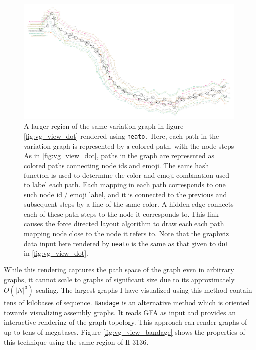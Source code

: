 \begin{figure}[htbp!] 
\centering    
\includegraphics[width=1.0\textwidth]{Chapter2/Figs/vg_view_dpS_H-3136_neato.pdf}
\caption[Force-directed layout with Graphviz's {\tt neato}]{
  A larger region of the same variation graph in figure \ref{fig:vg_view_dot} rendered using {\tt neato.}
    Here, each path in the variation graph is represented by a colored path, with the node steps 
    As in \ref{fig:vg_view_dot}, paths in the graph are represented as colored paths connecting node ids and emoji.
    The same hash function is used to determine the color and emoji combination used to label each path.
    Each mapping in each path corresponds to one such node id / emoji label, and it is connected to the previous and subsequent steps by a line of the same color.
    A hidden edge connects each of these path steps to the node it corresponds to.
    This link causes the force directed layout algorithm to draw each each path mapping node close to the node it refers to.
    Note that the graphviz data input here rendered by {\tt neato} is the same as that given to {\tt dot} in \ref{fig:vg_view_dot}.
}
\label{fig:vg_view_neato}
\end{figure}

While this rendering captures the path space of the graph even in arbitrary graphs, it cannot scale to graphs of significant size due to its approximately $O(|N|^3)$ scaling.
The largest graphs I have visualized using this method contain tens of kilobases of sequence.
{\tt Bandage} \cite{wick2015bandage} is an alternative method which is oriented towards visualizing assembly graphs.
It reads GFA as input and provides an interactive rendering of the graph topology.
This approach can render graphs of up to tens of megabases.
Figure \ref{fig:vg_view_bandage} shows the properties of this technique using the same region of H-3136.

